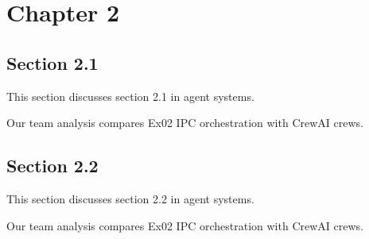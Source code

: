 \section{Chapter 2}

\subsection{Section 2.1}
This section discusses section 2.1 in agent systems. \cite{crewai2024}

Our team analysis compares Ex02 IPC orchestration with CrewAI crews. \cite{crewai2024}

\subsection{Section 2.2}
This section discusses section 2.2 in agent systems. \cite{crewai2024}

Our team analysis compares Ex02 IPC orchestration with CrewAI crews. \cite{crewai2024}
